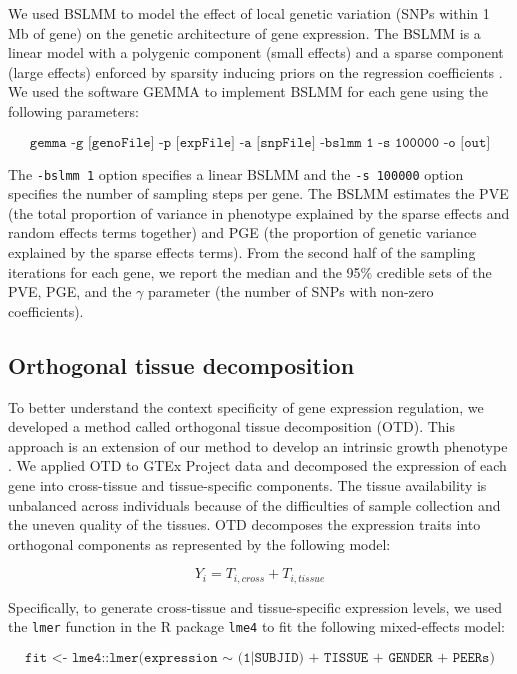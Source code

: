 \documentclass[10pt,letterpaper]{article}
\begin{document}
We used BSLMM \cite{Zhou_2013} to model the effect of local genetic variation
(SNPs within 1 Mb of gene) on the genetic architecture of gene
expression. The BSLMM is a linear model with a polygenic component (small effects) and a sparse component (large effects)
enforced by sparsity inducing priors on the
regression coefficients \cite{Zhou_2013}. We used the software GEMMA \cite{Zhou_2012} to
implement BSLMM for each gene using the following parameters:

\[ \texttt{gemma -g [genoFile] -p [expFile] -a [snpFile] -bslmm 1 -s 100000 -o [out]} \]

The \texttt{-bslmm 1} option specifies a linear BSLMM and the
\texttt{-s 100000} option specifies the number of sampling steps per
gene. The BSLMM estimates the PVE (the total proportion of variance in
phenotype explained by the sparse effects and random effects terms
together) and PGE (the proportion of genetic variance explained by the
sparse effects terms). From the second half of the sampling iterations
for each gene, we report the median and the 95\% credible sets of the
PVE, PGE, and the \textbar{}\(\gamma\)\textbar{} parameter (the number
of SNPs with non-zero coefficients).

\subsection*{Orthogonal tissue
decomposition}\label{orthogonal-tissue-decomposition}

To better understand the context specificity of gene expression
regulation, we developed a method called orthogonal tissue decomposition
(OTD). This approach is an extension of our method to develop an
intrinsic growth phenotype \cite{Im_2012}. We applied OTD to GTEx Project
\cite{Ardlie_2015} data and decomposed the expression of each gene into
cross-tissue and tissue-specific components. The tissue availability is
unbalanced across individuals because of the difficulties of sample
collection and the uneven quality of the tissues. OTD decomposes the
expression traits into orthogonal components as represented by the
following model:

\[ Y_i = T_{i,cross} + T_{i,tissue} \]

Specifically, to generate cross-tissue and tissue-specific expression
levels, we used the \texttt{lmer} function in the R \cite{R_Core_Team_2015} package
\texttt{lme4} \cite{Bates_2015a} to fit the following mixed-effects model:

\[ \texttt{fit <- lme4::lmer(expression $\sim$ (1|SUBJID) + TISSUE + GENDER + PEERs)} \]
\end{document}

